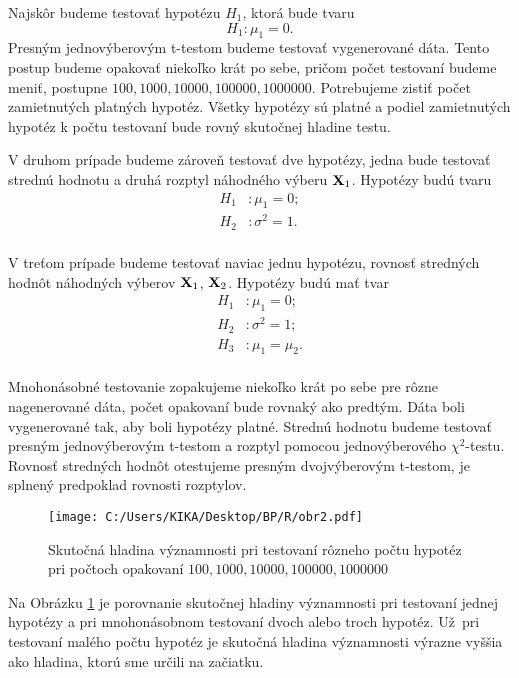 Najskôr budeme testovať hypotézu $H_1$, ktorá bude tvaru 
$$ H_1: \mu_1 = 0. $$
Presným jednovýberovým t-testom budeme testovať vygenerované dáta. 
Tento postup budeme opakovať niekoľko krát po sebe, pričom počet testovaní budeme meniť, 
postupne $100, 1000, 10000, 100000, 1000000$. 
Potrebujeme zistiť počet zamietnutých platných hypotéz. 
Všetky hypotézy sú platné a podiel zamietnutých hypotéz k počtu testovaní bude rovný skutočnej hladine testu. 

V druhom prípade budeme zároveň testovať dve hypotézy, jedna bude testovať strednú hodnotu 
a druhá rozptyl náhodného výberu ${\bf X}_1$. 
Hypotézy budú tvaru
\begin{align*}
H_1 & : \mu_1 = 0; \\
H_2 & : \sigma^2 = 1. \\
\end{align*}

V treťom prípade budeme testovať naviac jednu hypotézu, 
rovnosť stredných hodnôt náhodných výberov ${\bf X}_1$, ${\bf X}_2$. 
Hypotézy budú mať tvar 
\begin{align*}
H_1 & : \mu_1 = 0; \\
H_2 & : \sigma^2 = 1; \\ 
H_3 & : \mu_1 = \mu_2. \\
\end{align*}

Mnohonásobné testovanie zopakujeme niekoľko krát po sebe pre rôzne nagenerované dáta, 
počet opakovaní bude rovnaký ako predtým. 
Dáta boli vygenerované tak, aby boli hypotézy platné. 
Strednú hodnotu budeme testovať presným jednovýberovým t-testom a rozptyl pomocou jednovýberového $\chi^2$-testu. 
Rovnosť stredných hodnôt otestujeme presným dvojvýberovým t-testom, 
je splnený predpoklad rovnosti rozptylov. 

\begin{figure}[h!]
  \centering
  \texttt{[image: C:/Users/KIKA/Desktop/BP/R/obr2.pdf]}
  \caption{Skutočná hladina významnosti pri testovaní rôzneho počtu hypotéz 
  pri počtoch opakovaní $100, 1000, 10000, 100000, 1000000$}
  \captionsetup{justification=centering}
  \label{obr02:2}
\end{figure}

Na Obrázku \ref{obr02:2} je porovnanie skutočnej hladiny významnosti pri testovaní jednej hypotézy 
a pri mnohonásobnom testovaní dvoch alebo troch hypotéz. 
Už~pri testovaní malého počtu hypotéz je skutočná hladina významnosti výrazne vyššia 
ako hladina, ktorú sme určili na začiatku. 

